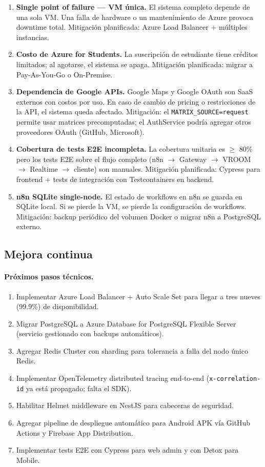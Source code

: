 \documentclass[12pt,a4paper,oneside]{article}
\begin{document}
\begin{enumerate}[leftmargin=*]
  \item \textbf{Single point of failure --- VM \'unica.} El sistema completo depende de una sola VM. Una falla de hardware o un mantenimiento de Azure provoca downtime total. Mitigaci\'on planificada: Azure Load Balancer + m\'ultiples instancias.
  \item \textbf{Costo de Azure for Students.} La suscripci\'on de estudiante tiene cr\'editos limitados; al agotarse, el sistema se apaga. Mitigaci\'on planificada: migrar a Pay-As-You-Go o On-Premise.
  \item \textbf{Dependencia de Google APIs.} Google Maps y Google OAuth son SaaS externos con costos por uso. En caso de cambio de pricing o restricciones de la API, el sistema queda afectado. Mitigaci\'on: el \texttt{MATRIX\_SOURCE=request} permite usar matrices precomputadas; el AuthService podr\'ia agregar otros proveedores OAuth (GitHub, Microsoft).
  \item \textbf{Cobertura de tests E2E incompleta.} La cobertura unitaria es $\geq$ 80\% pero los tests E2E sobre el flujo completo (n8n $\rightarrow$ Gateway $\rightarrow$ VROOM $\rightarrow$ Realtime $\rightarrow$ cliente) son manuales. Mitigaci\'on planificada: Cypress para frontend + tests de integraci\'on con Testcontainers en backend.
  \item \textbf{n8n SQLite single-node.} El estado de workflows en n8n se guarda en SQLite local. Si se pierde la VM, se pierde la configuraci\'on de workflows. Mitigaci\'on: backup peri\'odico del volumen Docker o migrar n8n a PostgreSQL externo.
\end{enumerate}

\subsection{Mejora continua}

\paragraph{Pr\'oximos pasos t\'ecnicos.}
\begin{enumerate}[leftmargin=*]
  \item Implementar Azure Load Balancer + Auto Scale Set para llegar a tres nueves (99.9\%) de disponibilidad.
  \item Migrar PostgreSQL a Azure Database for PostgreSQL Flexible Server (servicio gestionado con backups autom\'aticos).
  \item Agregar Redis Cluster con sharding para tolerancia a falla del nodo \'unico Redis.
  \item Implementar OpenTelemetry distributed tracing end-to-end (\texttt{x-correlation-id} ya est\'a propagado; falta el SDK).
  \item Habilitar Helmet middleware en NestJS para cabeceras de seguridad.
  \item Agregar pipeline de despliegue autom\'atico para Android APK v\'ia GitHub Actions y Firebase App Distribution.
  \item Implementar tests E2E con Cypress para web admin y con Detox para Mobile.
\end{enumerate}
\end{document}

